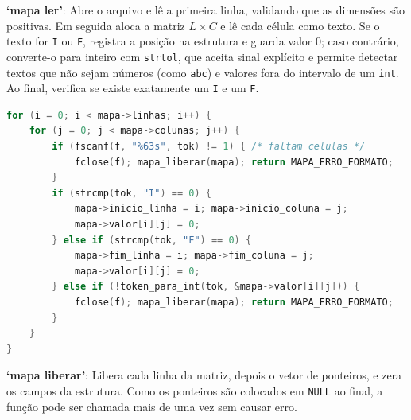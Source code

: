 \documentclass[12pt,a4paper]{article}
\makeatletter
\DeclareRobustCommand{\_}{%
  \ifmmode
    \nfss@text{\textunderscore}%
  \else
    \textunderscore\allowbreak
  \fi
}
\makeatother
\begin{document}
\textbf{`mapa\_ler'}: Abre o arquivo e lê a primeira linha, validando que as dimensões são positivas. Em seguida aloca a matriz $L \times C$ e lê cada célula como texto. Se o texto for \texttt{I} ou \texttt{F}, registra a posição na estrutura e guarda valor 0; caso contrário, converte-o para inteiro com \texttt{strtol}, que aceita sinal explícito e permite detectar textos que não sejam números (como \texttt{abc}) e valores fora do intervalo de um \texttt{int}. Ao final, verifica se existe exatamente um \texttt{I} e um \texttt{F}.
 
\begin{lstlisting}[language=C, caption={Trecho central da leitura das células em mapa\_ler.}]
for (i = 0; i < mapa->linhas; i++) {
    for (j = 0; j < mapa->colunas; j++) {
        if (fscanf(f, "%63s", tok) != 1) { /* faltam celulas */
            fclose(f); mapa_liberar(mapa); return MAPA_ERRO_FORMATO;
        }
        if (strcmp(tok, "I") == 0) {
            mapa->inicio_linha = i; mapa->inicio_coluna = j;
            mapa->valor[i][j] = 0;
        } else if (strcmp(tok, "F") == 0) {
            mapa->fim_linha = i; mapa->fim_coluna = j;
            mapa->valor[i][j] = 0;
        } else if (!token_para_int(tok, &mapa->valor[i][j])) {
            fclose(f); mapa_liberar(mapa); return MAPA_ERRO_FORMATO;
        }
    }
}
\end{lstlisting}
 
\textbf{`mapa\_liberar'}: Libera cada linha da matriz, depois o vetor de ponteiros, e zera os campos da estrutura. Como os ponteiros são colocados em \texttt{NULL} ao final, a função pode ser chamada mais de uma vez sem causar erro.
 
\end{document}

